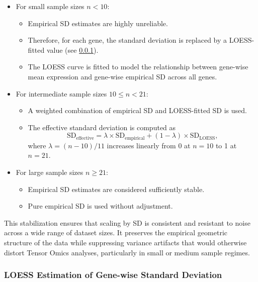\documentclass{article}
\begin{document}
\begin{itemize}
    \item For small sample sizes \( n < 10 \):
    \begin{itemize}
        \item Empirical SD estimates are highly unreliable.
        \item Therefore, for each gene, the standard deviation is replaced by a
          LOESS-fitted value (see \ref{gene_sd_loess_alg}).
        \item The LOESS curve is fitted to model the relationship between
          gene-wise mean expression and gene-wise empirical SD across all
          genes.
    \end{itemize}
    
    \item For intermediate sample sizes \( 10 \leq n < 21 \):
    \begin{itemize}
        \item A weighted combination of empirical SD and LOESS-fitted SD is used.
        \item The effective standard deviation is computed as
        \[
        \text{SD}_{\text{effective}} = \lambda \times \text{SD}_{\text{empirical}} + (1-\lambda) \times \text{SD}_{\text{LOESS}},
        \]
        where \( \lambda = (n-10)/11 \) increases linearly from 0 at \( n=10 \) to 1 at \( n=21 \).
    \end{itemize}
    
    \item For large sample sizes \( n \geq 21 \):
    \begin{itemize}
        \item Empirical SD estimates are considered sufficiently stable.
        \item Pure empirical SD is used without adjustment.
    \end{itemize}
\end{itemize}

This stabilization ensures that scaling by SD is consistent and resistant to noise across a wide range of dataset sizes.
It preserves the empirical geometric structure of the data while suppressing variance artifacts that would otherwise distort Tensor Omics analyses, particularly in small or medium sample regimes.

\subsubsection{LOESS Estimation of Gene-wise Standard Deviation}
\label{gene_sd_loess_alg}
\end{document}
